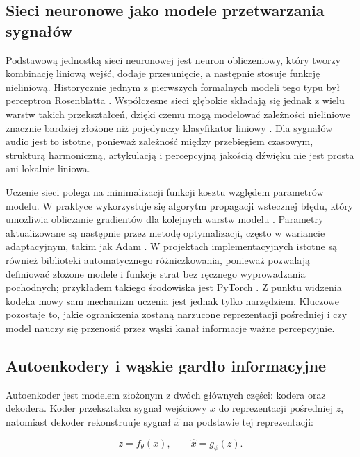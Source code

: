 \subsection{Sieci neuronowe jako modele przetwarzania sygnałów}
\label{subsec:sieci-neuronowe-przetwarzanie-sygnalow}

Podstawową jednostką sieci neuronowej jest neuron obliczeniowy, który tworzy kombinację liniową wejść, dodaje przesunięcie, a następnie stosuje funkcję nieliniową. Historycznie jednym z pierwszych formalnych modeli tego typu był perceptron Rosenblatta \cite{Rosenblatt1958Perceptron}. Współczesne sieci głębokie składają się jednak z wielu warstw takich przekształceń, dzięki czemu mogą modelować zależności nieliniowe znacznie bardziej złożone niż pojedynczy klasyfikator liniowy \cite{Goodfellow2016DeepLearning}. Dla sygnałów audio jest to istotne, ponieważ zależność między przebiegiem czasowym, strukturą harmoniczną, artykulacją i percepcyjną jakością dźwięku nie jest prosta ani lokalnie liniowa.

Uczenie sieci polega na minimalizacji funkcji kosztu względem parametrów modelu. W praktyce wykorzystuje się algorytm propagacji wstecznej błędu, który umożliwia obliczanie gradientów dla kolejnych warstw modelu \cite{Rumelhart1986Backprop}. Parametry aktualizowane są następnie przez metodę optymalizacji, często w wariancie adaptacyjnym, takim jak Adam \cite{Kingma2015Adam}. W projektach implementacyjnych istotne są również biblioteki automatycznego różniczkowania, ponieważ pozwalają definiować złożone modele i funkcje strat bez ręcznego wyprowadzania pochodnych; przykładem takiego środowiska jest PyTorch \cite{Paszke2019PyTorch}. Z punktu widzenia kodeka mowy sam mechanizm uczenia jest jednak tylko narzędziem. Kluczowe pozostaje to, jakie ograniczenia zostaną narzucone reprezentacji pośredniej i czy model nauczy się przenosić przez wąski kanał informacje ważne percepcyjnie.

\subsection{Autoenkodery i wąskie gardło informacyjne}
\label{subsec:autoenkodery-waskie-gardlo}

Autoenkoder jest modelem złożonym z dwóch głównych części: kodera oraz dekodera. Koder przekształca sygnał wejściowy \(x\) do reprezentacji pośredniej \(z\), natomiast dekoder rekonstruuje sygnał \(\hat{x}\) na podstawie tej reprezentacji:

\begin{equation}
    z = f_{\theta}(x), \qquad \hat{x} = g_{\phi}(z).
\end{equation}

